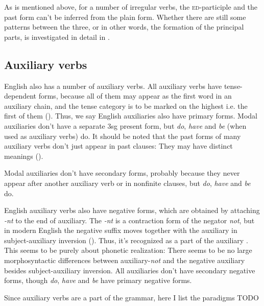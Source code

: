 \documentclass[UTF8, a4paper, oneside, scheme=plain, 12pt]{ctexbook}
\newcommand*{\citepage}[1]{p.~{#1}}
\newcommand*{\citepages}[1]{pp.~{#1}}
\newcommand{\form}[1]{\emph{#1}}
\newcommand{\category}[1]{\textsc{#1}}
\begin{document}
As is mentioned above, for a number of irregular verbs,
the \category{ed}-participle and the past form can't be inferred from the plain form.
Whether there are still some patterns between the three,
or in other words,
the formation of the principal parts,
is investigated in detail in \citet[\citepages{105-120}]{quirk1985}.

\subsection{Auxiliary verbs}\label{sec:verb-inflection.auxiliary}

English also has a number of auxiliary verbs.
All auxiliary verbs have tense-dependent forms,
because all of them may appear as the first word in an auxiliary chain,
and the tense category is to be marked on the highest i.e. the first of them ().
Thus, we say English auxiliaries also have primary forms.
Modal auxiliaries don't have a separate 3sg present form,
but \form{do}, \form{have} and \form{be} (when used as auxiliary verbs) do.
It should be noted that the past forms of many auxiliary verbs don't just appear in past clauses:
They may have distinct meanings ().

Modal auxiliaries don't have secondary forms,
probably because they never appear after another auxiliary verb 
or in nonfinite clauses,
but \form{do}, \form{have} and \form{be} do.

English auxiliary verbs also have negative forms,
which are obtained by attaching \form{-nt} to the end of auxiliary.
The \form{-nt} is a contraction form of the negator \form{not},
but in modern English the negative suffix moves together with the auxiliary in
subject-auxiliary inversion ().
Thus, it's recognized as a part of the auxiliary \citep[\citepage{91}]{cgel}.
This seems to be purely about phonetic realization:
There seems to be no large morphosyntactic differences 
between auxiliary-\form{not} and the negative auxiliary
besides subject-auxiliary inversion.
All auxiliaries don't have secondary negative forms,
though \form{do}, \form{have} and \form{be} have primary negative forms.

Since auxiliary verbs are a part of the grammar,
here I list the paradigms TODO
\end{document}
